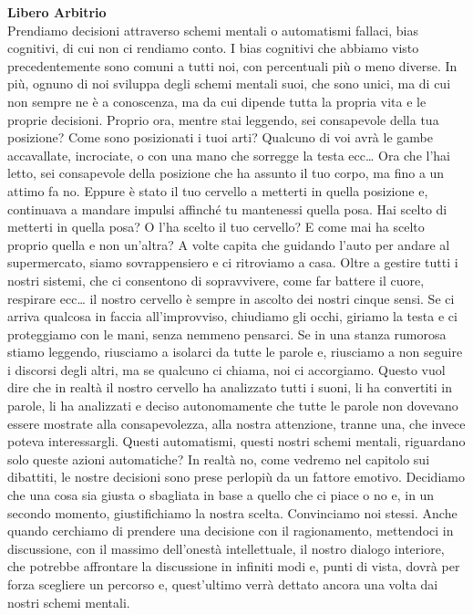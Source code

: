 \documentclass[12pt]{book} %
\begin{document}
\noindent \textbf{\large Libero Arbitrio} \\
Prendiamo decisioni attraverso schemi mentali o automatismi fallaci, bias cognitivi, di cui non ci rendiamo conto. I
bias cognitivi che abbiamo visto precedentemente sono comuni a tutti noi, con percentuali più o meno diverse. In più,
ognuno di noi sviluppa degli schemi mentali suoi, che sono unici, ma di cui non sempre ne è a conoscenza, ma da cui
dipende tutta la propria vita e le proprie decisioni. Proprio ora, mentre stai leggendo, sei consapevole della tua
posizione? Come sono posizionati i tuoi arti? Qualcuno di voi avrà le gambe accavallate, incrociate, o con una mano che
sorregge la testa ecc… Ora che l'hai letto, sei consapevole della posizione che ha assunto il tuo
corpo, ma fino a un attimo fa no. Eppure è stato il tuo cervello a metterti in quella posizione e, continuava a mandare
impulsi affinché tu mantenessi quella posa. Hai scelto di metterti in quella posa? O l'ha scelto
il tuo cervello? E come mai ha scelto proprio quella e non un'altra? A volte capita che guidando
l'auto per andare al supermercato, siamo sovrappensiero e ci ritroviamo a casa. Oltre a gestire
tutti i nostri sistemi, che ci consentono di sopravvivere, come far battere il cuore, respirare ecc… il nostro cervello
è sempre in ascolto dei nostri cinque sensi. Se ci arriva qualcosa in faccia all'improvviso,
chiudiamo gli occhi, giriamo la testa e ci proteggiamo con le mani, senza nemmeno pensarci. Se in una stanza rumorosa
stiamo leggendo, riusciamo a isolarci da tutte le parole e, riusciamo a non seguire i discorsi degli altri, ma se
qualcuno ci chiama, noi ci accorgiamo. Questo vuol dire che in realtà il nostro cervello ha analizzato tutti i suoni,
li ha convertiti in parole, li ha analizzati e deciso autonomamente che tutte le parole non dovevano essere mostrate
alla consapevolezza, alla nostra attenzione, tranne una, che invece poteva interessargli. Questi automatismi, questi
nostri schemi mentali, riguardano solo queste azioni automatiche? In realtà no, come vedremo nel capitolo sui
dibattiti, le nostre decisioni sono prese perlopiù da un fattore emotivo. Decidiamo che una cosa sia giusta o sbagliata
in base a quello che ci piace o no e, in un secondo momento, giustifichiamo la nostra scelta. Convinciamo noi stessi.
Anche quando cerchiamo di prendere una decisione con il ragionamento, mettendoci in discussione, con il massimo
dell'onestà intellettuale, il nostro dialogo interiore, che potrebbe affrontare la discussione in
infiniti modi e, punti di vista, dovrà per forza scegliere un percorso e, quest'ultimo verrà
dettato ancora una volta dai nostri schemi mentali. 
\end{document}
